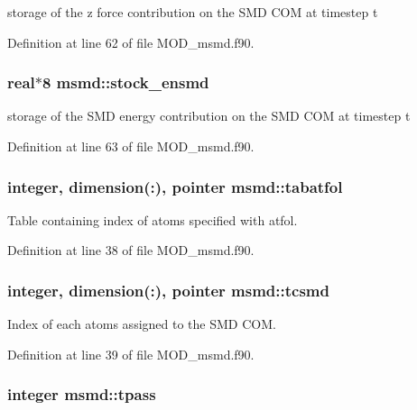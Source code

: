 storage of the z force contribution on the S\-M\-D C\-O\-M at timestep t 



Definition at line 62 of file M\-O\-D\-\_\-msmd.\-f90.

\hypertarget{classmsmd_ad2f343580b4cf844e2c9a84fea789100}{
\subsubsection[{stock\-\_\-ensmd}]{\setlength{\rightskip}{0pt plus 5cm}real$\ast$8 msmd\-::stock\-\_\-ensmd}}\label{classmsmd_ad2f343580b4cf844e2c9a84fea789100}


storage of the S\-M\-D energy contribution on the S\-M\-D C\-O\-M at timestep t 



Definition at line 63 of file M\-O\-D\-\_\-msmd.\-f90.

\hypertarget{classmsmd_acd0d6c7087206d9032bb505cc1ddb03a}{
\subsubsection[{tabatfol}]{\setlength{\rightskip}{0pt plus 5cm}integer, dimension(\-:), pointer msmd\-::tabatfol}}\label{classmsmd_acd0d6c7087206d9032bb505cc1ddb03a}


Table containing index of atoms specified with atfol. 



Definition at line 38 of file M\-O\-D\-\_\-msmd.\-f90.

\hypertarget{classmsmd_aed5f2109d5aea9e984f03f12175bc47b}{
\subsubsection[{tcsmd}]{\setlength{\rightskip}{0pt plus 5cm}integer, dimension(\-:), pointer msmd\-::tcsmd}}\label{classmsmd_aed5f2109d5aea9e984f03f12175bc47b}


Index of each atoms assigned to the S\-M\-D C\-O\-M. 



Definition at line 39 of file M\-O\-D\-\_\-msmd.\-f90.

\hypertarget{classmsmd_ac03367ffce116ce017105ef8fae32422}{
\subsubsection[{tpass}]{\setlength{\rightskip}{0pt plus 5cm}integer msmd\-::tpass}}\label{classmsmd_ac03367ffce116ce017105ef8fae32422}


